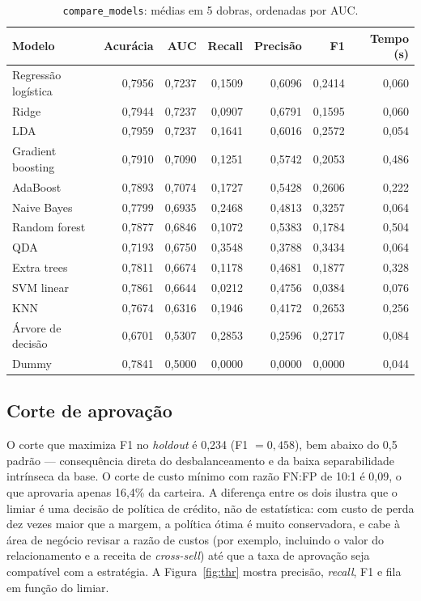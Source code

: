 \documentclass[11pt,a4paper]{article}
\newcommand{\code}[1]{\texttt{#1}}
\begin{document}
\begin{table}[H]
\centering\small
\caption{\code{compare\_models}: médias em 5 dobras, ordenadas por AUC.}
\label{tab:compare}
\begin{tabular}{lrrrrrr}
\toprule
Modelo & Acurácia & AUC & Recall & Precisão & F1 & Tempo (s) \\
\midrule
Regressão logística & 0,7956 & 0,7237 & 0,1509 & 0,6096 & 0,2414 & 0,060 \\
Ridge & 0,7944 & 0,7237 & 0,0907 & 0,6791 & 0,1595 & 0,060 \\
LDA & 0,7959 & 0,7237 & 0,1641 & 0,6016 & 0,2572 & 0,054 \\
Gradient boosting & 0,7910 & 0,7090 & 0,1251 & 0,5742 & 0,2053 & 0,486 \\
AdaBoost & 0,7893 & 0,7074 & 0,1727 & 0,5428 & 0,2606 & 0,222 \\
Naive Bayes & 0,7799 & 0,6935 & 0,2468 & 0,4813 & 0,3257 & 0,064 \\
Random forest & 0,7877 & 0,6846 & 0,1072 & 0,5383 & 0,1784 & 0,504 \\
QDA & 0,7193 & 0,6750 & 0,3548 & 0,3788 & 0,3434 & 0,064 \\
Extra trees & 0,7811 & 0,6674 & 0,1178 & 0,4681 & 0,1877 & 0,328 \\
SVM linear & 0,7861 & 0,6644 & 0,0212 & 0,4756 & 0,0384 & 0,076 \\
KNN & 0,7674 & 0,6316 & 0,1946 & 0,4172 & 0,2653 & 0,256 \\
Árvore de decisão & 0,6701 & 0,5307 & 0,2853 & 0,2596 & 0,2717 & 0,084 \\
Dummy & 0,7841 & 0,5000 & 0,0000 & 0,0000 & 0,0000 & 0,044 \\
\bottomrule
\end{tabular}
\end{table}

\subsection{Corte de aprovação}

O corte que maximiza F1 no \emph{holdout} é 0{,}234 (F1 $=0{,}458$), bem abaixo do 0{,}5 padrão --- consequência direta do desbalanceamento e da baixa separabilidade intrínseca da base. O corte de custo mínimo com razão FN:FP de 10:1 é 0{,}09, o que aprovaria apenas 16{,}4\% da carteira. A diferença entre os dois ilustra que o limiar é uma decisão de política de crédito, não de estatística: com custo de perda dez vezes maior que a margem, a política ótima é muito conservadora, e cabe à área de negócio revisar a razão de custos (por exemplo, incluindo o valor do relacionamento e a receita de \emph{cross-sell}) até que a taxa de aprovação seja compatível com a estratégia. A Figura~\ref{fig:thr} mostra precisão, \emph{recall}, F1 e fila em função do limiar.
\end{document}

